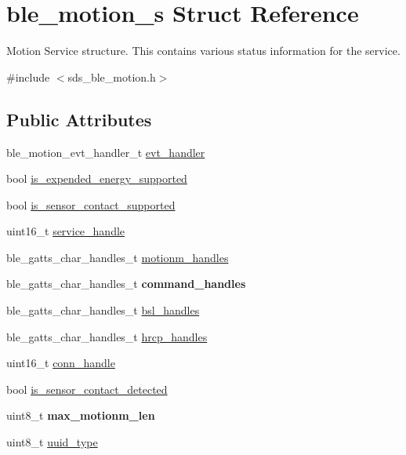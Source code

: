 \hypertarget{structble__motion__s}{}\section{ble\+\_\+motion\+\_\+s Struct Reference}
\label{structble__motion__s}


Motion Service structure. This contains various status information for the service.  




{\ttfamily \#include $<$sds\+\_\+ble\+\_\+motion.\+h$>$}

\subsection*{Public Attributes}
\begin{DoxyCompactItemize}
\item 
ble\+\_\+motion\+\_\+evt\+\_\+handler\+\_\+t \mbox{\hyperlink{structble__motion__s_aa576a74bdbf00c090ef2cf0be2cb3f99}{evt\+\_\+handler}}
\item 
bool \mbox{\hyperlink{structble__motion__s_a259baa33f4976e5df475993b603c051b}{is\+\_\+expended\+\_\+energy\+\_\+supported}}
\item 
bool \mbox{\hyperlink{structble__motion__s_ae2f757a31201086c4e392feee73cbfdd}{is\+\_\+sensor\+\_\+contact\+\_\+supported}}
\item 
uint16\+\_\+t \mbox{\hyperlink{structble__motion__s_afbe22f59669b316e1a5d8d89e4837643}{service\+\_\+handle}}
\item 
ble\+\_\+gatts\+\_\+char\+\_\+handles\+\_\+t \mbox{\hyperlink{structble__motion__s_a1da99e886537aca874d9d5e583126c0e}{motionm\+\_\+handles}}
\item 
\mbox{\label{structble__motion__s_af45acaa8b7db0abda50b686b8af98b73}} 
ble\+\_\+gatts\+\_\+char\+\_\+handles\+\_\+t {\bfseries command\+\_\+handles}
\item 
ble\+\_\+gatts\+\_\+char\+\_\+handles\+\_\+t \mbox{\hyperlink{structble__motion__s_afd1d7f5aa5d5250cf69dab40b47d12a8}{bsl\+\_\+handles}}
\item 
ble\+\_\+gatts\+\_\+char\+\_\+handles\+\_\+t \mbox{\hyperlink{structble__motion__s_aa15b65739fed65a16a32cd1ecd611de3}{hrcp\+\_\+handles}}
\item 
uint16\+\_\+t \mbox{\hyperlink{structble__motion__s_a50e8d63fbf3255cf706517bd837b8d60}{conn\+\_\+handle}}
\item 
bool \mbox{\hyperlink{structble__motion__s_a527aaa13584aa46834e84346eef94b88}{is\+\_\+sensor\+\_\+contact\+\_\+detected}}
\item 
\mbox{\label{structble__motion__s_a5ba8b79ab9265d58e0067439e69ebcdc}} 
uint8\+\_\+t {\bfseries max\+\_\+motionm\+\_\+len}
\item 
uint8\+\_\+t \mbox{\hyperlink{structble__motion__s_a8ae45e03dea1630dee7f9c4e1fa12a45}{uuid\+\_\+type}}
\end{DoxyCompactItemize}


